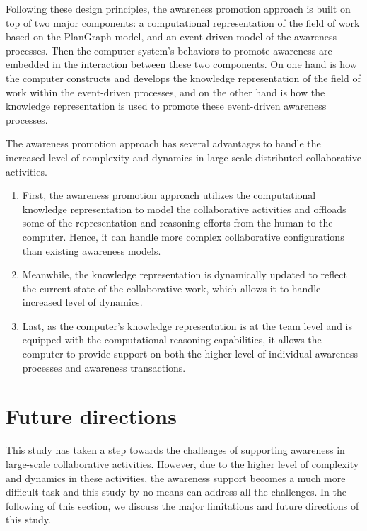 Following these design principles, the awareness promotion approach is built on top of two major components: a computational representation of the field of work based on the PlanGraph model, and an event-driven model of the awareness processes. Then the computer system’s behaviors to promote awareness are embedded in the interaction between these two components. On one hand is how the computer constructs and develops the knowledge representation of the field of work within the event-driven processes, and on the other hand is how the knowledge representation is used to promote these event-driven awareness processes.

The awareness promotion approach has several advantages to handle the increased level of complexity and dynamics in large-scale distributed collaborative activities.

\begin{enumerate}
	\item First, the awareness promotion approach utilizes the computational knowledge representation to model the collaborative activities and offloads some of the representation and reasoning efforts from the human to the computer. Hence, it can  handle more complex collaborative configurations than existing awareness models.
	\item Meanwhile, the knowledge representation is dynamically updated to reflect the current state of the collaborative work, which allows it to handle increased level of dynamics.
	\item Last, as the computer's knowledge representation is at the team level and is equipped with the computational reasoning capabilities, it allows the computer to provide support on both the higher level of individual awareness processes and awareness transactions.
\end{enumerate}

\section{Future directions} %
\label{sec:future_directions}
This study has taken a step towards the challenges of supporting awareness in large-scale collaborative activities. However, due to the higher level of complexity and dynamics in these activities, the awareness support becomes a much more difficult task and this study by no means can address all the challenges. In the following of this section, we discuss the major limitations and future directions of this study. 


